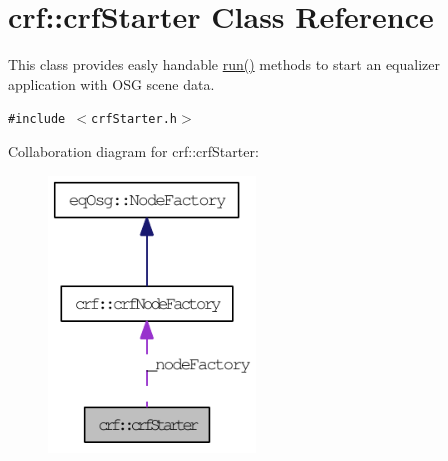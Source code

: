 \hypertarget{a00007}{
\section{crf::crfStarter Class Reference}
\label{a00007}
}
This class provides easly handable \hyperlink{a00007_bff219a07f93750e4e6db09fd026de7f}{run()} methods to start an equalizer application with OSG scene data.  


{\tt \#include $<$crfStarter.h$>$}

Collaboration diagram for crf::crfStarter:\nopagebreak
\begin{figure}[H]
\begin{center}
\leavevmode
\includegraphics[width=156pt]{a00079}
\end{center}
\end{figure}
